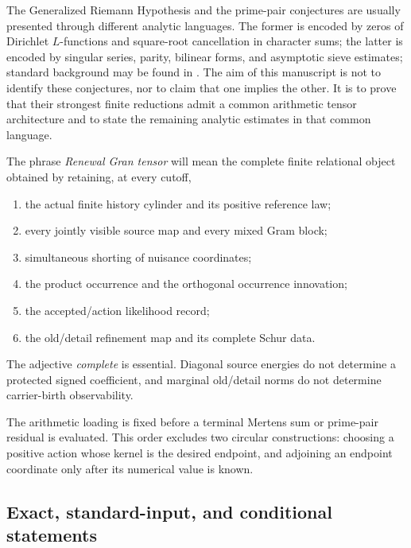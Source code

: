 \documentclass[11pt]{article}
\theoremstyle{definition}
\theoremstyle{remark}
\begin{document}
The Generalized Riemann Hypothesis and the prime-pair conjectures are usually
presented through different analytic languages.  The former is encoded by
zeros of Dirichlet $L$-functions and square-root cancellation in character
sums; the latter is encoded by singular series, parity, bilinear forms, and
asymptotic sieve estimates; standard background may be found in \cite{Davenport,IK,MV}.  The aim of this manuscript is not to identify
these conjectures, nor to claim that one implies the other.  It is to prove
that their strongest finite reductions admit a common arithmetic tensor
architecture and to state the remaining analytic estimates in that common
language.

The phrase \emph{Renewal Gran tensor} will mean the complete finite relational
object obtained by retaining, at every cutoff,
\begin{enumerate}[label=\textup{(G\arabic*)},leftmargin=3.2em]
\item the actual finite history cylinder and its positive reference law;
\item every jointly visible source map and every mixed Gram block;
\item simultaneous shorting of nuisance coordinates;
\item the product occurrence and the orthogonal occurrence innovation;
\item the accepted/action likelihood record;
\item the old/detail refinement map and its complete Schur data.
\end{enumerate}
The adjective \emph{complete} is essential.  Diagonal source energies do not
determine a protected signed coefficient, and marginal old/detail norms do not
determine carrier-birth observability.

The arithmetic loading is fixed before a terminal Mertens sum or prime-pair
residual is evaluated.  This order excludes two circular constructions:
choosing a positive action whose kernel is the desired endpoint, and adjoining
an endpoint coordinate only after its numerical value is known.

\subsection{Exact, standard-input, and conditional statements}
\end{document}
